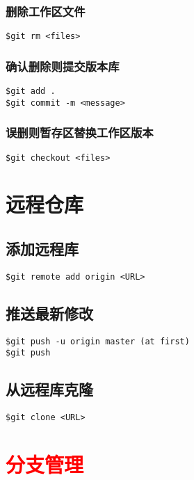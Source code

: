\subsubsection{删除工作区文件}
\begin{lstlisting}
$git rm <files>
\end{lstlisting}

\subsubsection{确认删除则提交版本库}
\begin{lstlisting}
$git add .
$git commit -m <message>
\end{lstlisting}

\subsubsection{误删则暂存区替换工作区版本}
\begin{lstlisting}
$git checkout <files>
\end{lstlisting}

\section{远程仓库}
\subsection{添加远程库}
\begin{lstlisting}
$git remote add origin <URL>
\end{lstlisting}

\subsection{推送最新修改}
\begin{lstlisting}
$git push -u origin master (at first)
$git push
\end{lstlisting}

\subsection{从远程库克隆}
\begin{lstlisting}
$git clone <URL>
\end{lstlisting}

\section{\textcolor{red}{\textbf{分支管理}}}

